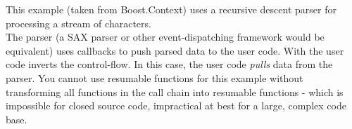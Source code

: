\newpage
{}\label{appendix}
This example (taken from Boost.Context\cite{bcontext}) uses a recursive descent
parser for processing a stream of characters.\\
The parser (a SAX parser or other event-dispatching framework would be
equivalent) uses callbacks to push parsed data to the user code. With \ectx the
user code inverts the control-flow. In this case, the user code \emph{pulls}
data from the parser.
You cannot use resumable functions for this example without transforming all
functions in the call chain into resumable functions - which is impossible for
closed source code, impractical at best for a large, complex code base.
